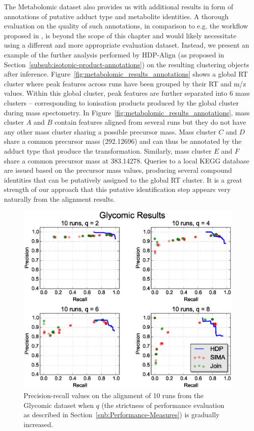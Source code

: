 The Metabolomic dataset also provides us with additional results in form of annotations of putative adduct type and metabolite identities. A thorough evaluation on the quality of such annotations, in comparison to e.g. the workflow proposed in \cite{Lee2013}, is beyond the scope of this chapter and would likely necessitate using a different and more appropriate evaluation dataset. Instead, we present an example of the further analysis performed by HDP-Align (as proposed in Section~\ref{subsub:isotopic-product-annotations}) on the resulting clustering objects after inference. Figure~\ref{fig:metabolomic_results_annotations} shows a global \ac{RT} cluster where peak features across runs have been grouped by their \ac{RT} and m/z values. Within this global cluster, peak features are further separated into 6 mass clusters -- corresponding to ionisation products produced by the global cluster during mass spectometry. In Figure~\ref{fig:metabolomic_results_annotations}, mass cluster $A$ and $B$ contain features aligned from several runs but they do not have any other mass cluster sharing a possible precursor mass. Mass cluster $C$ and $D$ share a common precursor mass (292.12696) and can thus be annotated by the adduct type that produce the transformation. Similarly, mass cluster $E$ and $F$ share a common precursor mass at 383.14278. Queries to a local KEGG database are issued based on the precursor mass values, producing several compound identities that can be putatively assigned to the global \ac{RT} cluster. It is a great strength of our approach that this putative identification step appears very naturally from the alignment results.

\begin{figure}[!htbp]
\centering\includegraphics[width=0.7\linewidth]{05-hdp/figures/figure_5.eps}
\centering\caption{\label{fig:glycomic_results}Precision-recall values on the alignment of 10 runs from the Glycomic dataset when $q$ (the strictness of performance evaluation as described in Section~\ref{sub:Performance-Measures}) is gradually increased.}
\end{figure}

